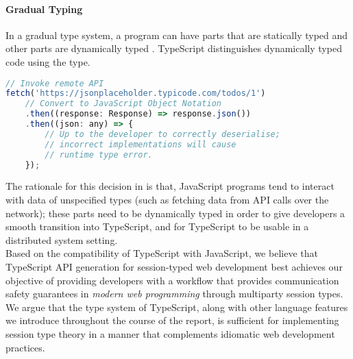 \paragraph{Gradual Typing}
In a gradual type system, a program can have parts
that are statically typed and other parts are dynamically
typed \cite{GradualTyping}.
TypeScript distinguishes dynamically typed code using
the  type.

\begin{lstlisting}[language=javascript]
// Invoke remote API
fetch('https://jsonplaceholder.typicode.com/todos/1')
	// Convert to JavaScript Object Notation
	.then((response: Response) => response.json())
	.then((json: any) => {
		// Up to the developer to correctly deserialise;
		// incorrect implementations will cause
		// runtime type error.
	});
\end{lstlisting}

The rationale for this decision in \cite{UnderstandingTypeScript}
is that, JavaScript programs tend to interact with
data of unspecified types (such as fetching data
from API calls over the network); these parts
need to be dynamically typed in order to give developers
a smooth transition into TypeScript, and for TypeScript
to be usable in a distributed system setting. \\

\noindent
Based on the compatibility of TypeScript
with JavaScript, 
we believe that TypeScript API generation for session-typed
web development best achieves our objective
of providing
developers with a workflow
that provides communication safety guarantees in \textit{modern
web programming}
through multiparty session types.
We argue that the type system of TypeScript,
along with other language features we introduce
throughout the course of the report, is sufficient
for implementing session type theory in a manner that
complements idiomatic web development practices.